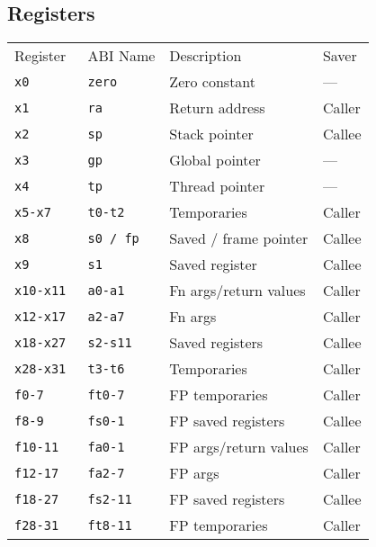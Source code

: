 \subsection{Registers}
\renewcommand{\arraystretch}{1.2}
\setlength\tabcolsep{6pt} %
\begin{tabularx}{\linewidth}{@{}llll@{}}
    Register     & ABI Name     & Description           & Saver  \\
    \cmidrule{1-4}
    \tt{x0}      & \tt{zero}    & Zero constant         & ---    \\
    \tt{x1}      & \tt{ra}      & Return address        & Caller \\
    \tt{x2}      & \tt{sp}      & Stack pointer         & Callee \\
    \tt{x3}      & \tt{gp}      & Global pointer        & ---    \\
    \tt{x4}      & \tt{tp}      & Thread pointer        & ---    \\
    \tt{x5-x7}   & \tt{t0-t2}   & Temporaries           & Caller \\
    \tt{x8}      & \tt{s0 / fp} & Saved / frame pointer & Callee \\
    \tt{x9}      & \tt{s1}      & Saved register        & Callee \\
    \tt{x10-x11} & \tt{a0-a1}   & Fn args/return values & Caller \\
    \tt{x12-x17} & \tt{a2-a7}   & Fn args               & Caller \\
    \tt{x18-x27} & \tt{s2-s11}  & Saved registers       & Callee \\
    \tt{x28-x31} & \tt{t3-t6}   & Temporaries           & Caller \\
    \cmidrule{1-4}
    \tt{f0-7}    & \tt{ft0-7}   & FP temporaries        & Caller \\
    \tt{f8-9}    & \tt{fs0-1}   & FP saved registers    & Callee \\
    \tt{f10-11}  & \tt{fa0-1}   & FP args/return values & Caller \\
    \tt{f12-17}  & \tt{fa2-7}   & FP args               & Caller \\
    \tt{f18-27}  & \tt{fs2-11}  & FP saved registers    & Callee \\
    \tt{f28-31}  & \tt{ft8-11}  & FP temporaries        & Caller \\
\end{tabularx}
\renewcommand{\arraystretch}{1}
\setlength\tabcolsep{6pt} %